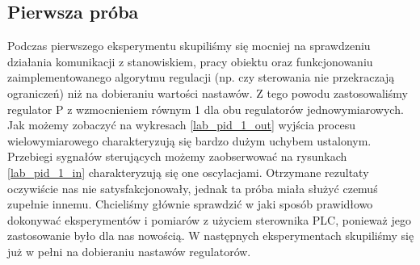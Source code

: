 \subsection{Pierwsza próba}
\label{thermal_pid_proba_1}
Podczas pierwszego eksperymentu skupiliśmy się mocniej na sprawdzeniu działania komunikacji z stanowiskiem, pracy obiektu oraz funkcjonowaniu zaimplementowanego algorytmu regulacji (np. czy sterowania nie przekraczają ograniczeń) niż na dobieraniu wartości nastawów. Z tego powodu zastosowaliśmy regulator P z wzmocnieniem równym 1 dla obu regulatorów jednowymiarowych. Jak możemy zobaczyć na wykresach \ref{lab_pid_1_out} wyjścia procesu wielowymiarowego charakteryzują się bardzo dużym uchybem ustalonym. Przebiegi sygnałów sterujących możemy zaobserwować na rysunkach \ref{lab_pid_1_in} charakteryzują się one oscylacjami. Otrzymane rezultaty oczywiście nas nie satysfakcjonowały, jednak ta próba miała służyć czemuś zupełnie innemu. Chcieliśmy głównie sprawdzić w jaki sposób prawidłowo dokonywać eksperymentów i pomiarów z użyciem sterownika PLC, ponieważ jego zastosowanie było dla nas nowością. W następnych eksperymentach skupiliśmy się już w pełni na dobieraniu nastawów regulatorów. 



